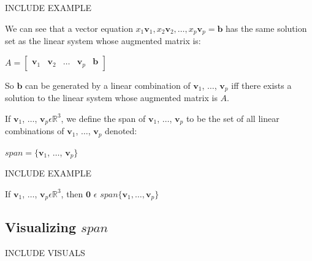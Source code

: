 \documentclass{report}
\begin{document}
\begin{center}
	INCLUDE EXAMPLE
\end{center}
We can see that a vector equation $x_1\mathbf{v}_1,x_2\mathbf{v}_2, \ldots ,x_p\mathbf{v}_p = \mathbf{b}$ has the same solution set as the linear system whose augmented matrix is:
\begin{center}
	 $A = \begin{bmatrix} \mathbf{v}_1 & \mathbf{v}_2 & \ldots & \mathbf{v}_p & \mathbf{b} \end{bmatrix}$
\end{center}
So $\mathbf{b}$ can be generated by a linear combination of $\mathbf{v}_1$, $\ldots$, $\mathbf{v}_p$ iff there exists a solution to the linear system whose augmented matrix is $A$.
\begin{definition}
	If $\mathbf{v}_1$, $\ldots$, $\mathbf{v}_p \epsilon \mathbb{R}^3$, we define the span of $\mathbf{v}_1$, $\ldots$, $\mathbf{v}_p$ to be the set of all linear combinations of $\mathbf{v}_1$, $\ldots$, $\mathbf{v}_p$ denoted:
	\begin{center}
		$span=\{ \mathbf{v}_1$, $\ldots$, $\mathbf{v}_p\}$
	\end{center}
\end{definition}
\begin{center}
	INCLUDE EXAMPLE
\end{center}
\begin{theorem}
	If $\mathbf{v}_1$, $\ldots$, $\mathbf{v}_p \epsilon \mathbb{R}^3$, then $\mathbf{0}$ $\epsilon$ $span\{ \mathbf{v}_1, \ldots, \mathbf{v}_p\}$
\end{theorem}
\subsection*{Visualizing $span$}
\begin{center}
	INCLUDE VISUALS
\end{center}
\end{document}
